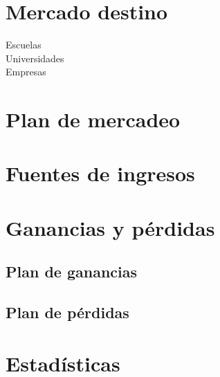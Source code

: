 \documentclass[12pt,spanish,lettersize]{report}
\begin{document}
\chapter{Mercado destino}
\begin{description}
\item[Escuelas]
\item[Universidades]
\item[Empresas]
\end{description}
\chapter{Plan de mercadeo}
\chapter{Fuentes de ingresos}
\chapter{Ganancias y p\'erdidas}
\section{Plan de ganancias}
\section{Plan de p\'erdidas}
\appendix
\chapter{Estad\'isticas}
\end{document}
